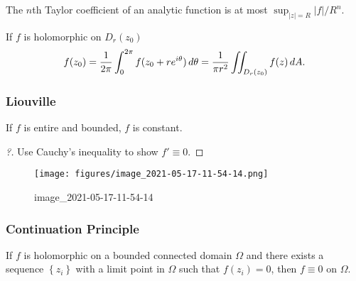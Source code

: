 \begin{slogan}

The \(n\)th Taylor coefficient of an analytic function is at most
\(\sup_{{\left\lvert {z} \right\rvert} = R} {\left\lvert {f} \right\rvert}/R^n\).

\end{slogan}

\begin{theorem}

If \(f\) is holomorphic on \(D_r(z_0)\)
\begin{align*}
f(z_0) 
= {1\over 2\pi} \int_0^{2\pi} f(z_0 + re^{i\theta}) \,d\theta
= {1\over \pi r^2} \iint_{D_r(z_0)} f(z)\, dA
.\end{align*}

\end{theorem}

\hypertarget{liouville}{%
\subsubsection{Liouville}\label{liouville}}

\begin{theorem}\label{Liouville}

If \(f\) is entire and bounded, \(f\) is constant.

\end{theorem}

\begin{proof}[?]

Use Cauchy's inequality to show \(f'\equiv 0\).

\end{proof}

\begin{exercise}[?]

\begin{figure}
\centering
\texttt{[image: figures/image\_2021-05-17-11-54-14.png]}
\caption{image\_2021-05-17-11-54-14}
\end{figure}

\end{exercise}

\hypertarget{continuation-principle}{%
\subsubsection{Continuation Principle}\label{continuation-principle}}

\begin{theorem}

If \(f\) is holomorphic on a bounded connected domain \(\Omega\) and
there exists a sequence \(\left\{{z_i}\right\}\) with a limit point in
\(\Omega\) such that \(f(z_i) = 0\), then \(f\equiv 0\) on \(\Omega\).

\end{theorem}

